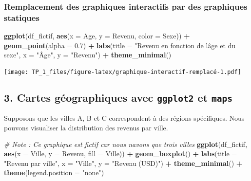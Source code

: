 \documentclass[
]{article}
\newenvironment{Shaded}{\begin{snugshade}}{\end{snugshade}}
\newcommand{\AttributeTok}[1]{\textcolor[rgb]{0.13,0.29,0.53}{#1}}
\newcommand{\CommentTok}[1]{\textcolor[rgb]{0.56,0.35,0.01}{\textit{#1}}}
\newcommand{\FloatTok}[1]{\textcolor[rgb]{0.00,0.00,0.81}{#1}}
\newcommand{\FunctionTok}[1]{\textcolor[rgb]{0.13,0.29,0.53}{\textbf{#1}}}
\newcommand{\NormalTok}[1]{#1}
\newcommand{\SpecialCharTok}[1]{\textcolor[rgb]{0.81,0.36,0.00}{\textbf{#1}}}
\newcommand{\StringTok}[1]{\textcolor[rgb]{0.31,0.60,0.02}{#1}}
\begin{document}
\hypertarget{remplacement-des-graphiques-interactifs-par-des-graphiques-statiques}{%
\subsubsection{Remplacement des graphiques interactifs par des
graphiques
statiques}\label{remplacement-des-graphiques-interactifs-par-des-graphiques-statiques}}

\begin{Shaded}
\begin{Highlighting}[]
\FunctionTok{ggplot}\NormalTok{(df\_fictif, }\FunctionTok{aes}\NormalTok{(}\AttributeTok{x =}\NormalTok{ Age, }\AttributeTok{y =}\NormalTok{ Revenu, }\AttributeTok{color =}\NormalTok{ Sexe)) }\SpecialCharTok{+}
  \FunctionTok{geom\_point}\NormalTok{(}\AttributeTok{alpha =} \FloatTok{0.7}\NormalTok{) }\SpecialCharTok{+}
  \FunctionTok{labs}\NormalTok{(}\AttributeTok{title =} \StringTok{"Revenu en fonction de l\textquotesingle{}âge et du sexe"}\NormalTok{, }\AttributeTok{x =} \StringTok{"Âge"}\NormalTok{, }\AttributeTok{y =} \StringTok{"Revenu"}\NormalTok{) }\SpecialCharTok{+}
  \FunctionTok{theme\_minimal}\NormalTok{()}
\end{Highlighting}
\end{Shaded}

\texttt{[image: TP\_1\_files/figure-latex/graphique-interactif-remplacé-1.pdf]}

\hypertarget{cartes-guxe9ographiques-avec-ggplot2-et-maps}{%
\subsection{\texorpdfstring{3. Cartes géographiques avec
\texttt{ggplot2} et
\texttt{maps}}{3. Cartes géographiques avec ggplot2 et maps}}\label{cartes-guxe9ographiques-avec-ggplot2-et-maps}}

Supposons que les villes A, B et C correspondent à des régions
spécifiques. Nous pouvons visualiser la distribution des revenus par
ville.

\begin{Shaded}
\begin{Highlighting}[]
\CommentTok{\# Note : Ce graphique est fictif car nous n\textquotesingle{}avons que trois villes}
\FunctionTok{ggplot}\NormalTok{(df\_fictif, }\FunctionTok{aes}\NormalTok{(}\AttributeTok{x =}\NormalTok{ Ville, }\AttributeTok{y =}\NormalTok{ Revenu, }\AttributeTok{fill =}\NormalTok{ Ville)) }\SpecialCharTok{+}
  \FunctionTok{geom\_boxplot}\NormalTok{() }\SpecialCharTok{+}
  \FunctionTok{labs}\NormalTok{(}\AttributeTok{title =} \StringTok{"Revenu par ville"}\NormalTok{, }\AttributeTok{x =} \StringTok{"Ville"}\NormalTok{, }\AttributeTok{y =} \StringTok{"Revenu (USD)"}\NormalTok{) }\SpecialCharTok{+}
  \FunctionTok{theme\_minimal}\NormalTok{() }\SpecialCharTok{+}
  \FunctionTok{theme}\NormalTok{(}\AttributeTok{legend.position =} \StringTok{"none"}\NormalTok{)}
\end{Highlighting}
\end{Shaded}
\end{document}
